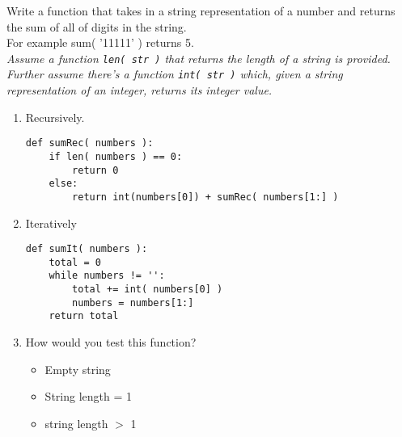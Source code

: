 Write a function that takes in a string representation of a number and returns the sum
        of all of digits in the string. \\For example sum( '11111' ) returns 5. \\
        \emph{Assume a function \texttt{len( str )} that returns the length of a string is provided. \\
         Further assume there's a function \texttt{int( str )} which, given a string representation of an integer, returns its integer value.}

        \begin{enumerate}
            \item Recursively. 
\begin{answer}
\begin{lstlisting}
def sumRec( numbers ):
    if len( numbers ) == 0:
        return 0
    else:
        return int(numbers[0]) + sumRec( numbers[1:] )
\end{lstlisting}
\end{answer}

            \item Iteratively
\begin{answer}
\begin{lstlisting}
def sumIt( numbers ):
    total = 0
    while numbers != '':
        total += int( numbers[0] )
        numbers = numbers[1:]
    return total
\end{lstlisting}
\end{answer}
            \item How would you test this function?
                \begin{answer}
                \begin{itemize}
                    \item Empty string 
                    \item String length = 1
                    \item string length $>$ 1
                \end{itemize}
                \end{answer}
\end{enumerate}